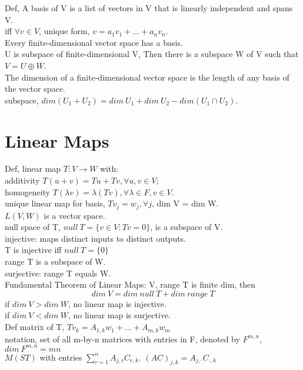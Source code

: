 \documentclass[paper=a4, fontsize=11pt]{scrartcl} %
\numberwithin{equation}{section} %
\numberwithin{figure}{section} %
\numberwithin{table}{section} %
\begin{document}
Def, A basis of V is a list of vectors in V that is linearly independent and spans V.\\
iff $\forall v\in V$, unique form, $v=a_1v_1+\dots+a_nv_n$. \\
Every finite-dimensional vector space has a basis.\\
U is subspace of finite-dimensional V, Then there is a subspace W of V such that $V=U\oplus W$.\\
The dimension of a finite-dimensional vector space is the length of any basis of the vector space.\\
subspace, $dim(U_1+U_2) = dim\ U_1 +dim\ U_2 - dim(U_1\cap U_2)$.


\section{Linear Maps}
Def, linear map $T:V\rightarrow W$ with:\\
additivity $T(u+v)=Tu+Tv, \forall u,v\in V$;\\
homogeneity $T(\lambda v) = \lambda (Tv), \forall \lambda\in F, v\in V$.\\
unique linear map for basis, $Tv_j = w_j,\forall j$, dim V = dim W.\\
$L(V,W)$ is a vector space.\\
null space of T, $null\ T = \{v\in V: Tv=0\}$, is a subspace of V.\\
injective: maps distinct inputs to distinct outputs.\\
T is injective iff $null\ T =\{0\}$\\
range T is a subspace of W.\\
surjective: range T equals W.\\
Fundamental Theorem of Linear Maps: V, range T is finite dim, then 
\begin{equation}
dim\ V = dim\ null\ T + dim\ range\ T
\end{equation}
if $dim\ V > dim\ W$, no linear map is injective.\\
if $dim\ V < dim\ W$, no linear map is surjective.\\
Def matrix of T,  $Tv_k = A_{1,k}w_1+\dots+A_{m,k} w_m$\\
notation, set of all m-by-n matrices with entries in F, denoted by $F^{m,n}$, $dim\ F^{m,n} = mn$\\
$M(ST)$ with entries $\sum_{r=1}^n A_{j,r}C_{r,k}$. $(AC)_{j,k}=A_{j,\cdot} C_{\cdot,k}$\\
\end{document}
